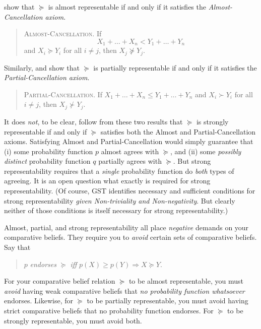 \citet{Kraft1959} show that $\succeq$ is almost representable if and only if it satisfies the \textit{Almost-Cancellation axiom}.
\begin{quote}
\textsc{Almost-Cancellation}. If
$$ X_1+\ldots+X_n<Y_1+\ldots+Y_n $$
and $X_i\succeq Y_i$ for all $i\not=j$, then $X_j\not\succeq Y_j$.
\end{quote}

Similarly, \citet{Adams1965} and \citet{Fishburn1969} show that $\succeq$ is partially representable if and only if it satisfies the \textit{Partial-Cancellation axiom}.
\begin{quote}
\textsc{Partial-Cancellation}.  If $ X_1+\ldots+X_n\leq Y_1+\ldots+Y_n $ and $X_i\succ Y_i$ for all $i\not=j$, then $X_j\not\succ Y_j$.
\end{quote}

It does \textit{not}, to be clear, follow from these two results that $\succeq$ is strongly representable if and only if $\succeq$ satisfies both the Almost and Partial-Cancellation axioms. Satisfying Almost and Partial-Cancellation would simply guarantee that (i) some probability function $p$ almost agrees with $\succeq$, and (ii) some \textit{possibly distinct} probability function $q$ partially agrees with $\succeq$. But strong representability requires that a \textit{single} probability function do \textit{both} types of agreeing. It is an open question what exactly is required for strong representability. (Of course, GST identifies necessary and sufficient conditions for strong representability \textit{given Non-triviality and Non-negativity}. But clearly neither of those conditions is itself necessary for strong representability.)

Almost, partial, and strong representability all place \textit{negative} demands on your comparative beliefs. They require you to \textit{avoid} certain sets of comparative beliefs. Say that 
\begin{quote}\centering
$p$ \emph{endorses} $\succeq$ \hspace{.3em}\emph{iff}\hspace{.2em} $p(X)\geq p(Y) \Rightarrow X\succeq Y$.
\end{quote}
For your comparative belief relation $\succeq$ to be almost representable, you must \textit{avoid} having weak comparative beliefs that \textit{no probability function whatsoever} endorses. Likewise, for $\succeq$ to be partially representable, you must avoid having strict comparative beliefs that no probability function endorses. For $\succeq$ to be strongly representable, you must avoid both.

